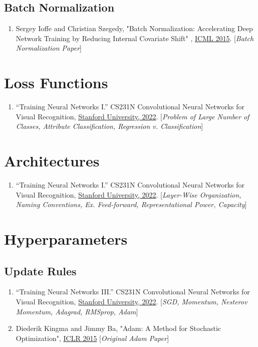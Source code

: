 \documentclass[12pt]{article}
\begin{document}
\subsection{Batch Normalization}
\begin{enumerate}
    \item Sergey Ioffe and Christian Szegedy, "Batch Normalization: 
    Accelerating Deep Network Training by Reducing Internal Covariate Shift"
    , \href{https://arxiv.org/abs/1502.03167}{ICML 2015}. 
    [\emph{Batch Normalization Paper}]
\end{enumerate}

\section{Loss Functions}
\begin{enumerate}
    \item “Training Neural Networks I.” 
    CS231N Convolutional Neural Networks for Visual Recognition, 
    \href{https://cs231n.github.io/neural-networks-2/#losses}{Stanford University, 2022}.
    [\emph{Problem of Large Number of Classes, Attribute Classification, 
    Regression v. Classification}]
\end{enumerate}

\section{Architectures}
\begin{enumerate}
    \item “Training Neural Networks I.” 
    CS231N Convolutional Neural Networks for Visual Recognition, 
    \href{https://cs231n.github.io/neural-networks-1/#nn}{Stanford University, 2022}.
    [\emph{Layer-Wise Organization, Naming Conventions, Ex. Feed-forward, 
    Representational Power, Capacity}]
\end{enumerate}

\section{Hyperparameters}
\subsection{Update Rules}
\begin{enumerate}
    \item “Training Neural Networks III.” 
    CS231N Convolutional Neural Networks for Visual Recognition, 
    \href{https://cs231n.github.io/neural-networks-3/#update}{Stanford University, 2022}. 
    [\emph{SGD, Momentum, Nesterov Momentum, Adagrad, RMSprop, Adam}]

    \item Diederik Kingma and Jimmy Ba, 
    "Adam: A Method for Stochastic Optimization", 
    \href{https://arxiv.org/abs/1412.6980}{ICLR 2015}
    [\emph{Original Adam Paper}]
\end{enumerate}
\end{document}

